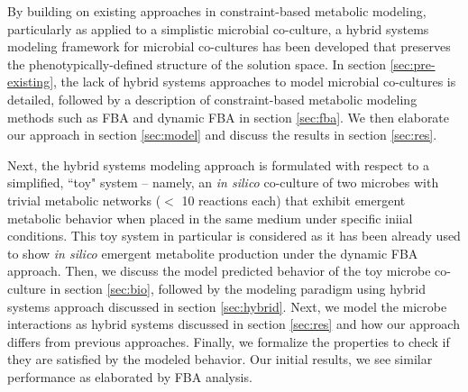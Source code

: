 
By building on existing approaches in constraint-based metabolic modeling, particularly as applied to a simplistic microbial co-culture, a hybrid systems modeling framework for microbial co-cultures has been developed that preserves the phenotypically-defined structure of the solution space. In section \ref{sec:pre-existing}, the lack of hybrid systems approaches to model microbial co-cultures is detailed, followed by a description of constraint-based metabolic modeling methods such as FBA and dynamic FBA in section \ref{sec:fba}. We then elaborate our approach in section \ref{sec:model} and discuss the results in section \ref{sec:res}. 


Next, the hybrid systems modeling approach is formulated with respect to a simplified, ``toy" system -- namely, an {\it{in silico}} co-culture of two microbes with trivial metabolic networks ($<$ 10 reactions each) that exhibit emergent metabolic behavior when placed in the same medium under specific iniial conditions. This toy system in particular is considered as it has been already used to show \textit{in silico} emergent metabolite production under the dynamic FBA approach\cite{Chiu14}. Then, we discuss the model predicted behavior of the toy microbe co-culture in section \ref{sec:bio}, followed by the modeling paradigm using hybrid systems approach discussed in section \ref{sec:hybrid}. Next, we model the microbe interactions as hybrid systems discussed in section \ref{sec:res} and how our approach differs from previous approaches. Finally, we formalize the properties to check if they are satisfied by the modeled behavior. Our initial results, we see similar performance as elaborated by FBA analysis. 



